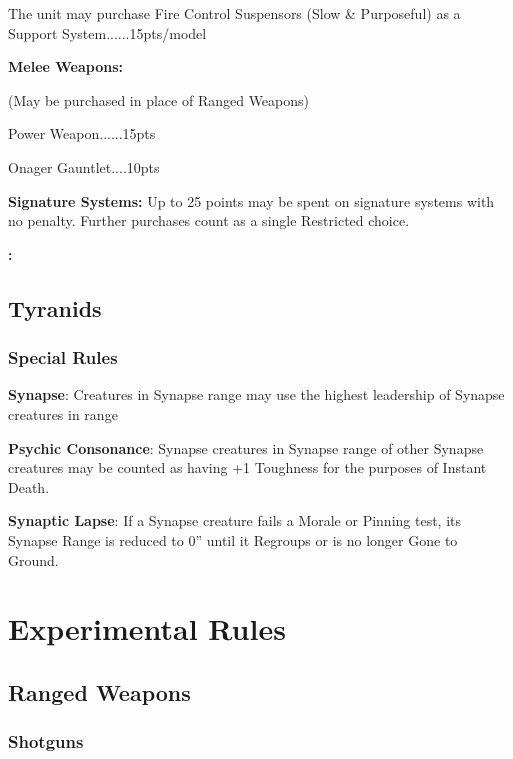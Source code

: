 \documentclass[letterpaper,twocolumn,oneside,titlepage]{book}
\begin{document}
The unit may purchase Fire Control Suspensors (Slow \& Purposeful) as a Support System......15pts/model

\textbf{Melee Weapons:}

(May be purchased in place of Ranged Weapons)

Power Weapon......15pts

Onager Gauntlet....10pts

\textbf{Signature Systems:}
Up to 25 points may be spent on signature systems with no penalty. Further purchases count as a single Restricted choice.

\textbf{:}

\section{\texorpdfstring{\textbf{Tyranids}}{Tyranids}}\label{tyranids}

\subsection{\texorpdfstring{\textbf{Special
Rules}}{Special Rules}}\label{special-rules}

\textbf{Synapse}: Creatures in Synapse range may use the highest
leadership of Synapse creatures in range

\textbf{Psychic Consonance}: Synapse creatures in Synapse range of other
Synapse creatures may be counted as having +1 Toughness for the purposes
of Instant Death.

\textbf{Synaptic Lapse}: If a Synapse creature fails a Morale or Pinning
test, its Synapse Range is reduced to 0'' until it Regroups or is no
longer Gone to Ground.

\chapter{\texorpdfstring{\textbf{Experimental
Rules}}{Experimental Rules}}\label{experimental-rules}

\section{\texorpdfstring{\textbf{Ranged Weapons}}{Ranged Weapons}}\label{ranged-weapons-1}
\subsection{\texorpdfstring{\textbf{Shotguns}}{Shotguns}}\label{shotguns}
\end{document}
